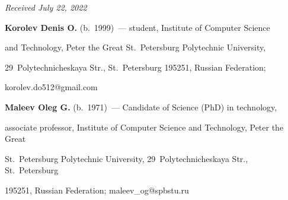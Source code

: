 \vspace*{-6pt}





\hfill{\small\textit{Received July 22, 2022}} 





\vspace*{-12pt}


  


  \Contr


  


  \noindent


  \textbf{Korolev Denis O.} (b.\ 1999)~--- student, Institute of Computer Science 


and Technology, Peter the Great St.\ Petersburg Polytechnic University,  


29~Polytechnicheskaya Str., St.\ Petersburg 195251, Russian Federation; 


\mbox{korolev.do512@gmail.com}


  


  \vspace*{3pt}


  


  \noindent


  \textbf{Maleev Oleg G.} (b.\ 1971)~--- Candidate of Science (PhD) in technology, 


associate professor, Institute of Computer Science and Technology, Peter the Great 


St.\ Petersburg Polytechnic University, 29~Polytechnicheskaya Str., St.\ Petersburg 


195251, Russian Federation; \mbox{maleev\_og@spbstu.ru}








\label{end\stat}





\renewcommand{\bibname}{\protect\rm Литература} 



